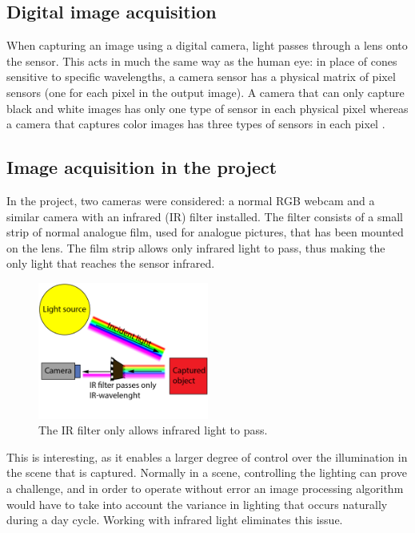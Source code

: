 \subsection{Digital image acquisition}
When capturing an image using a digital camera, light passes through a lens onto the sensor. This acts in much the same way as the human eye: in place of cones sensitive to specific wavelengths, a camera sensor has a physical matrix of pixel sensors (one for each pixel in the output image). A camera that can only capture black and white images has only one type of sensor in each physical pixel whereas a camera that captures color images has three types of sensors in each pixel \citep{ip_book}.

\subsection{Image acquisition in the project}
In the project, two cameras were considered: a normal RGB webcam and a similar camera with an infrared (IR) filter installed. The filter consists of a small strip of normal analogue film, used for analogue pictures, that has been mounted on the lens. The film strip allows only infrared light to pass, thus making the only light that reaches the sensor infrared.

\begin{figure}[htbp] 
\centering 
\includegraphics[width=0.5\textwidth]{Pictures/Theory/IR_filter.png} 
\caption{The IR filter only allows infrared light to pass.} 
\label{fig:ir_filter} 
\end{figure}

This is interesting, as it enables a larger degree of control over the illumination in the scene that is captured. Normally in a scene, controlling the lighting can prove a challenge, and in order to operate without error an image processing algorithm would have to take into account the variance in lighting that occurs naturally during a day cycle. \citep{ip_book} Working with infrared light eliminates this issue.


